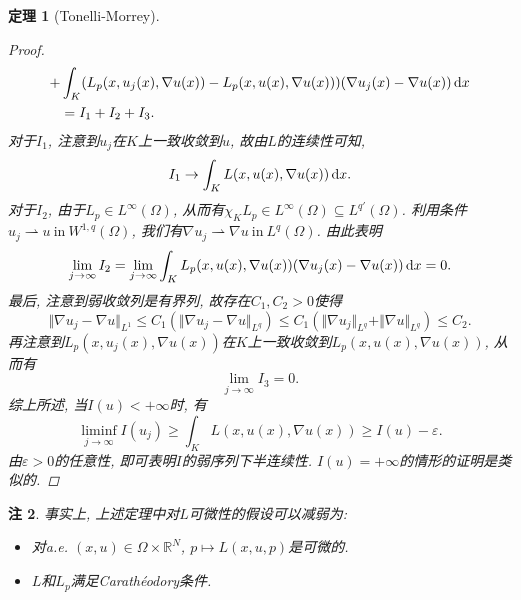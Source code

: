\documentclass[12pt,a4paper]{article}
\newtheorem{theorem}{定理}[section]
\newtheorem{remark}[theorem]{注}
\begin{document}
\begin{theorem}[Tonelli-Morrey]
\begin{proof}
\begin{align*}
            + &\int_K(L_p(x, u_j(x), \nabla u(x)) - L_p(x, u(x), \nabla u(x)))(\nabla u_j(x) - \nabla u(x)) \,{\rm d}x \\ 
            &= I_1 + I_2 + I_3.
        \end{align*}
        对于$I_1$, 注意到$u_j$在$K$上一致收敛到$u$, 故由$L$的连续性可知, 
        \begin{equation*}
            I_1 \rightarrow \int_KL(x, u(x), \nabla u(x)) \,{\rm d}x.
        \end{equation*}
        对于$I_2$, 由于$L_p \in L^{\infty}(\Omega)$, 从而有$\chi_KL_p \in L^{\infty}(\Omega) \subseteq L^{q'}(\Omega)$.
        利用条件$u_j \rightharpoonup u \ \text{in}\ W^{1, q}(\Omega)$, 我们有$\nabla u_j \rightharpoonup \nabla u\ \text{in}\ L^q(\Omega)$.
        由此表明 
        \begin{equation*}
            \lim\limits_{j \rightarrow \infty}I_2 = \lim\limits_{j \rightarrow \infty}\int_KL_p(x, u(x), \nabla u(x))(\nabla u_j(x) - \nabla u(x)) \,{\rm d}x = 0.
        \end{equation*}
        最后, 注意到弱收敛列是有界列, 故存在$C_1, C_2 > 0$使得 
        \begin{equation*}
            \Vert \nabla u_j - \nabla u\Vert_{L^1} \leq C_1(\Vert \nabla u_j - \nabla u\Vert_{L^q}) \leq C_1(\Vert \nabla u_j\Vert_{L^q} + \Vert \nabla u\Vert_{L^q}) \leq C_2.
        \end{equation*}
        再注意到$L_p(x, u_j(x), \nabla u(x))$在$K$上一致收敛到$L_p(x, u(x), \nabla u(x))$, 从而有 
        \begin{equation*}
            \lim\limits_{j \rightarrow \infty}I_3 = 0.
        \end{equation*}
        综上所述, 当$I(u) < +\infty$时, 有 
        \begin{equation*}
            \liminf\limits_{j \rightarrow \infty}I(u_j) \geq \int_KL(x, u(x), \nabla u(x)) \geq I(u) - \varepsilon.
        \end{equation*}
        由$\varepsilon > 0$的任意性, 即可表明$I$的弱序列下半连续性. $I(u) = +\infty$的情形的证明是类似的.
    \end{proof}
\end{theorem}

\begin{remark}
    事实上, 上述定理中对$L$可微性的假设可以减弱为:
    \begin{itemize}
        \item 对a.e. $(x, u) \in \Omega \times \mathbb{R}^N$, $p \mapsto L(x, u, p)$是可微的.
        \item $L$和$L_p$满足Carathéodory条件.
    \end{itemize}
\end{remark}
\end{document}
